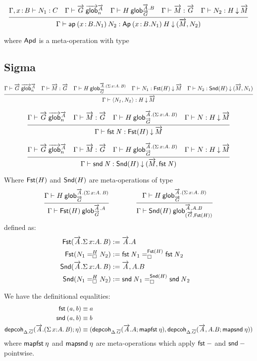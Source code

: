 \[
\infer
  {\ofdepglob{\Gamma}{\apd{(\tptm xB.N_1)}{N_2}}
             {\Apd{(\tptm xB.N_1)}{H}}{(\tel M,N_2)}}
  {\ofglob{\Gamma,\tptm xB}{N_1}{C}
  &\wfglob{\Gamma}{\tel G}{\tel A}{n}
  &\wfdepglob{\Gamma}{H}{\tel A.B}{\tel G}
  &\ofglob{\Gamma}{\tel M}{\tel G}
  &\ofdepglob{\Gamma}{N_2}{H}{\tel M}}
\]

where $\dsd{Apd}$ is a meta-operation with type

\subsection{Sigma}

\begin{small}\[
\infer
  {\ofdepglob{\Gamma}{\pair{N_1}{N_2}}{H}{\tel M}}
  {\wfglob{\Gamma}{\tel G}{\tel A}n
  &\ofglob{\Gamma}{\tel M}{\tel G}
  &\wfdepglob{\Gamma}{H}{\tel A.(\sigmacl xAB)}{\tel G}
  &\ofdepglob{\Gamma}{N_1}{\Fstsigma H}{\tel M}
  &\ofdepglob{\Gamma}{N_2}{\Sndsigma H}{(\tel M,N_1)}}
\]\end{small}

\[
\infer
  {\ofdepglob{\Gamma}{\fst N}{\Fstsigma H}{\tel M}}
  {\wfglob{\Gamma}{\tel G}{\tel A}n
  &\ofglob{\Gamma}{\tel M}{\tel G}
  &\wfdepglob{\Gamma}{H}{\tel A.(\sigmacl xAB)}{\tel G}
  &\ofdepglob{\Gamma}{N}{H}{\tel M}}
\]

\[
\infer
  {\ofdepglob{\Gamma}{\snd N}{\Sndsigma H}{(\tel M,\fst N)}}
  {\wfglob{\Gamma}{\tel G}{\tel A}n
  &\ofglob{\Gamma}{\tel M}{\tel G}
  &\wfdepglob{\Gamma}{H}{\tel A.(\sigmacl xAB)}{\tel G}
  &\ofdepglob{\Gamma}{N}{H}{\tel M}}
\]

Where $\Fstsigma H$ and $\Sndsigma H$ are meta-operations of type
\[
\infer
  {\wfdepglob{\Gamma}{\Fstsigma H}{\tel A.A}{\tel G}}
  {\wfdepglob{\Gamma}{H}{\tel A.(\sigmacl xAB)}{\tel G}}
\qquad\qquad
\infer
  {\wfdepglob{\Gamma}{\Sndsigma H}{\tel A,A.B}{(\tel G,\Fstsigma H)}}
  {\wfdepglob{\Gamma}{H}{\tel A.(\sigmacl xAB)}{\tel G}}
\]
defined as:
\[\begin{aligned}
\Fstsigma{\tel A.\sigmacl xAB} &:= \tel A.A \\
\Fstsigma{\dhomj{H}{N_1}{N_2}{\blank}} &:=
\dhomj{\Fstsigma H}{\fst N_1}{\fst N_2}{\blank}
&\\
\Sndsigma{\tel A.\sigmacl xAB} &:= \tel A,A.B \\
\Sndsigma{\dhomj{H}{N_1}{N_2}{\blank}} &:=
\dhomj{\Sndsigma H}{\snd N_1}{\snd N_2}{\blank}
\end{aligned}\]

We have the definitional equalities:
\[\begin{aligned}
\fst{(a,b)} &\equiv a \\
\snd{(a,b)} &\equiv b \\
\depcoh{\Delta.\diag G}{\tel A.(\sigmacl xAB)}{\eta} &\equiv
(\depcoh{\Delta.\diag G}{\tel A.A}{\mapfst\eta},
\depcoh{\Delta.\diag G}{\tel A,A.B}{\mapsnd\eta}) \\
\end{aligned}\]
where $\mapfst\eta$ and $\mapsnd\eta$ are meta-operations which apply $\fst-$
and $\snd-$ pointwise.

